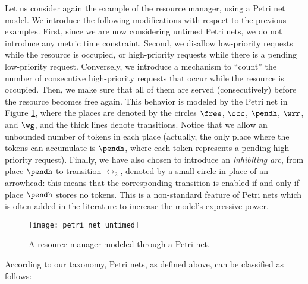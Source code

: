 Let us consider again the example of the resource manager, using 
a Petri net model. We introduce the following modifications with 
respect to the previous examples. First, since we are now considering 
untimed Petri nets, we do not introduce any metric time constraint. 
Second, we disallow low-priority requests while the resource 
is occupied, or high-priority requests while there is a pending 
low-priority request. Conversely, we introduce a mechanism to 
``count'' the number of consecutive high-priority requests that 
occur while the resource is occupied. Then, we make sure that 
all of them are served (consecutively) before the resource becomes 
free again. This behavior is modeled by the Petri net in Figure \ref{fig:petri_net_untimed}, 
where the places are denoted by the circles $\free$, $\occ$, $\pendh$, $\wrr$, 
and $\wg$, and the thick lines denote transitions. Notice that 
we allow an unbounded number of tokens in each place (actually, 
the only place where the tokens can accumulate is $\pendh$, 
where each token represents a pending high-priority request). 
Finally, we have also chosen to introduce an \emph{inhibiting arc}, 
from place $\pendh$ to transition $\rel_{2}$, denoted by a small circle 
in place of an arrowhead: this means that the corresponding transition 
is enabled if and only if place $\pendh$ stores no tokens. This 
is a non-standard feature of Petri nets which is often added 
in the literature to increase the model's expressive power.
\begin{figure}[htb!]
	 \centering
	 \texttt{[image: petri\_net\_untimed]}
	 \caption{A resource manager modeled through a Petri net.}
	 \label{fig:petri_net_untimed}
\end{figure}

According to our taxonomy, Petri nets, as defined above, can 
be classified as follows: 

